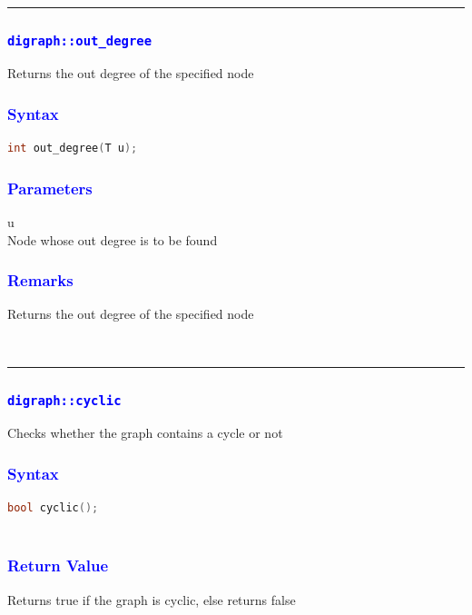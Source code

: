 \documentclass[11pt,a4paper]{article}
\begin{document}
\\
\rule{17cm}{0.1mm}


\subsubsection*{\textcolor{blue}{\Large\texttt{digraph::out\_degree}}}
Returns the out degree of the specified node
\subsubsection*{\textcolor{blue}{ \large {Syntax}}}
\begin{lstlisting}[language=C++]
int out_degree(T u);


\end{lstlisting}
\subsubsection*{\textcolor{blue}{ \large {Parameters}}}
u\\
Node whose out degree is to be found



\subsubsection*{\textcolor{blue}{ \large {Remarks}}}
Returns the out degree of the specified node


\\
\rule{17cm}{0.1mm}

\subsubsection*{\textcolor{blue}{\Large\texttt{digraph::cyclic}}}
Checks whether the graph contains a cycle or not

\subsubsection*{\textcolor{blue}{ \large {Syntax}}}
\begin{lstlisting}[language=C++]
bool cyclic();



\end{lstlisting}
\subsubsection*{\textcolor{blue}{ \large {Return Value}}}
Returns true if the graph is cyclic, else returns false
\end{document}
